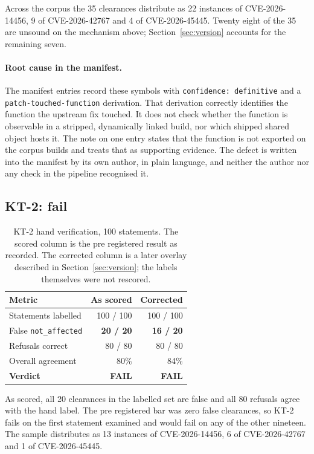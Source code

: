 Across the corpus the 35 clearances distribute as 22 instances of
CVE-2026-14456, 9 of CVE-2026-42767 and 4 of CVE-2026-45445. Twenty eight of the
35 are unsound on the mechanism above; Section~\ref{sec:version} accounts for
the remaining seven.

\paragraph{Root cause in the manifest.} The manifest entries record these symbols
with \texttt{confidence: definitive} and a \texttt{patch-touched-function}
derivation. That derivation correctly identifies the function the upstream fix
touched. It does not check whether the function is observable in a stripped,
dynamically linked build, nor which shipped shared object hosts it. The note on
one entry states that the function is not exported on the corpus builds and
treats that as supporting evidence. The defect is written into the manifest by
its own author, in plain language, and neither the author nor any check in the
pipeline recognised it.

\subsection{KT-2: fail}

\begin{table}[t]
\caption{KT-2 hand verification, 100 statements. The scored column is the
pre registered result as recorded. The corrected column is a later overlay
described in Section~\ref{sec:version}; the labels themselves were not
rescored.}
\label{tab:kt2}
\centering
\begin{tabular}{@{}lrr@{}}
\toprule
Metric & As scored & Corrected \\
\midrule
Statements labelled & 100 / 100 & 100 / 100 \\
False \texttt{not\_affected} & \textbf{20 / 20} & \textbf{16 / 20} \\
Refusals correct & 80 / 80 & 80 / 80 \\
Overall agreement & 80\% & 84\% \\
\textbf{Verdict} & \textbf{FAIL} & \textbf{FAIL} \\
\bottomrule
\end{tabular}
\end{table}

As scored, all 20 clearances in the labelled set are false and all 80 refusals
agree with the hand label. The pre registered bar was zero false clearances, so
KT-2 fails on the first statement examined and would fail on any of the other
nineteen. The sample distributes as 13 instances of CVE-2026-14456, 6 of
CVE-2026-42767 and 1 of CVE-2026-45445.

